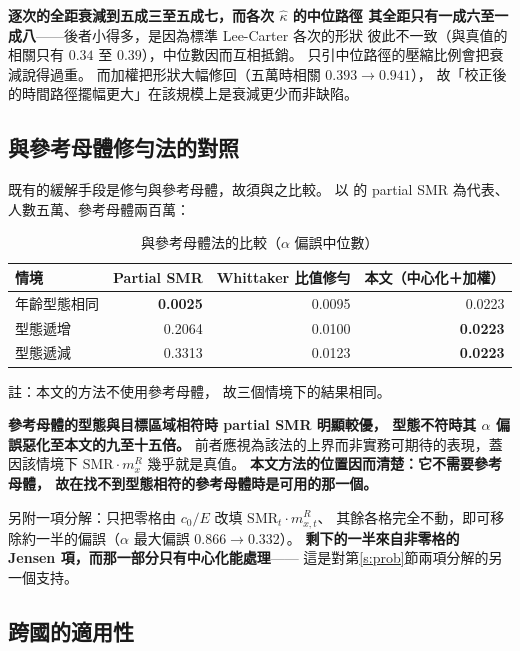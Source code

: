 \documentclass[UTF8, fontset=macnew, a4paper, 12pt]{ctexart}
\begin{document}
\textbf{逐次的全距衰減到五成三至五成七，而各次 $\hat\kappa$ 的中位路徑
其全距只有一成六至一成八}——後者小得多，是因為標準 Lee-Carter 各次的形狀
彼此不一致（與真值的相關只有 $0.34$ 至 $0.39$），中位數因而互相抵銷。
只引中位路徑的壓縮比例會把衰減說得過重。
而加權把形狀大幅修回（五萬時相關 $0.393\to0.941$），
故「校正後的時間路徑擺幅更大」在該規模上是衰減更少而非缺陷。

\subsection{與參考母體修勻法的對照}

既有的緩解手段是修勻與參考母體，故須與之比較。
以 \citet{lee2003} 的 partial SMR 為代表、人數五萬、參考母體兩百萬：

\begin{table}[H]
\centering
\caption{與參考母體法的比較（$\alpha$ 偏誤中位數）}
\small
\begin{tabular}{lrrr}
\toprule
情境 & Partial SMR & Whittaker 比值修勻 & 本文（中心化＋加權）\\
\midrule
年齡型態相同 & \textbf{0.0025} & 0.0095 & 0.0223\\
型態遞增 & 0.2064 & 0.0100 & \textbf{0.0223}\\
型態遞減 & 0.3313 & 0.0123 & \textbf{0.0223}\\
\bottomrule
\end{tabular}

\vspace{2pt}
\parbox{0.92\textwidth}{\footnotesize 註：本文的方法不使用參考母體，
故三個情境下的結果相同。}
\label{t:smr}
\end{table}

\textbf{參考母體的型態與目標區域相符時 partial SMR 明顯較優，
型態不符時其 $\alpha$ 偏誤惡化至本文的九至十五倍。}
前者應視為該法的上界而非實務可期待的表現，蓋因該情境下
$\mathrm{SMR}\cdot m^{R}_x$ 幾乎就是真值。
\textbf{本文方法的位置因而清楚：它不需要參考母體，
故在找不到型態相符的參考母體時是可用的那一個。}

另附一項分解：只把零格由 $c_0/E$ 改填 $\mathrm{SMR}_t\cdot m^{R}_{x,t}$、
其餘各格完全不動，即可移除約一半的偏誤（$\alpha$ 最大偏誤 $0.866\to0.332$）。
\textbf{剩下的一半來自非零格的 Jensen 項，而那一部分只有中心化能處理}——
這是對第\ref{s:prob}節兩項分解的另一個支持。

\subsection{跨國的適用性}\label{ss:cross}
\end{document}
